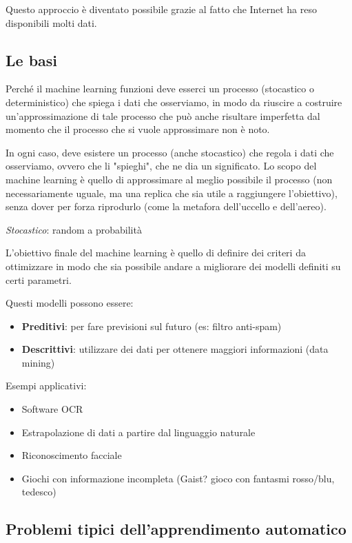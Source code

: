 Questo approccio è diventato possibile grazie al fatto che Internet ha reso disponibili molti dati.

\subsection{Le basi}\label{le-basi}

Perché il machine learning funzioni deve esserci un processo
(stocastico o deterministico) che spiega i dati che osserviamo, in modo
da riuscire a costruire un'approssimazione di tale processo che può
anche risultare imperfetta dal momento che il processo che si vuole
approssimare non è noto.

In ogni caso, deve esistere un processo (anche stocastico) che regola i dati che osserviamo, ovvero che li "spieghi", che ne dia un significato. Lo scopo del 
machine learning è quello di approssimare al meglio possibile il processo (non necessariamente uguale, ma una replica che sia utile a raggiungere l'obiettivo),
 senza dover per forza riprodurlo (come la metafora dell'uccello e dell'aereo).

\emph{Stocastico}: random a probabilità

L'obiettivo finale del machine learning è quello di definire dei criteri
da ottimizzare in modo che sia possibile andare a migliorare dei modelli
definiti su certi parametri.

Questi modelli possono essere:

\begin{itemize}
\item
  \textbf{Preditivi}: per fare previsioni sul futuro (es: filtro
  anti-spam)
\item
  \textbf{Descrittivi}: utilizzare dei dati per ottenere maggiori
  informazioni (data mining)
\end{itemize}

Esempi applicativi:

\begin{itemize}
\item
  Software OCR
\item
  Estrapolazione di dati a partire dal linguaggio naturale
\item
  Riconoscimento facciale
\item
  Giochi con informazione incompleta (Gaist? gioco con fantasmi
  rosso/blu, tedesco)
\end{itemize}

\subsection{Problemi tipici dell'apprendimento automatico}\label{problemi-tipici-dellapprendimento-automatico}

